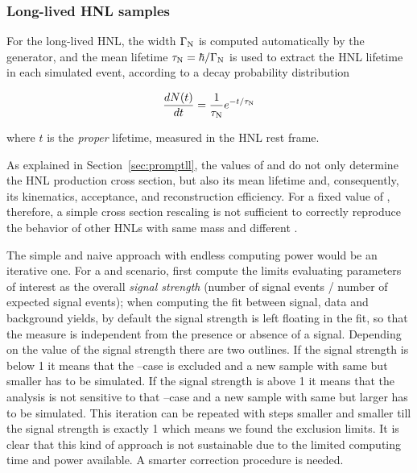\subsubsection{Long-lived HNL samples}\label{sec:reweighting}
For the long-lived HNL, the width $\Gamma_{\mathrm{N}}$ is computed automatically by the
generator, and the mean lifetime $\tau_{\mathrm{N}} = \hbar/\Gamma_{\mathrm{N}}$
is used to extract the HNL lifetime in each simulated event,
according to a decay probability distribution
\begin{linenomath}
  \begin{equation}
\frac{dN(t)}{dt} = \frac{1}{\tau_{\mathrm{N}}}e^{-t/\tau_{\mathrm{N}}}
  \end{equation}
  \label{eq:dndt}
\end{linenomath}
where $t$ is the
\emph{proper} lifetime, measured in the HNL rest frame.

As explained in Section~\ref{sec:promptll}, the values of \mhnl
and \mixpar do not only determine the HNL production cross section,
but also its mean lifetime and, consequently, its kinematics,
acceptance, and reconstruction efficiency.
For a fixed value of \mhnl, therefore, a simple cross section
rescaling is not sufficient to correctly reproduce the behavior of
other HNLs with same mass and different \mixpar.

The simple and naive approach with endless computing power would be an
iterative one. For a \mhnl
and \mixpar scenario, first compute the limits evaluating parameters
of interest as the overall \emph{signal strength} (number of signal events /
number of expected signal events); when computing the fit between
signal, data and background yields, by default the signal strength is
left floating in the fit, so that the measure is independent from the
presence or absence of a signal. Depending on the value of the signal
strength there are two outlines. If the signal strength is below 1 it
means that the \mhnl --\mixpar case is excluded and a new sample with
same \mhnl but smaller \mixpar has to be simulated. If the signal strength is above 1 it
means that the analysis is not sensitive to that \mhnl --\mixpar case and a new sample with
same \mhnl but larger \mixpar has to be simulated. This iteration can
be repeated with steps smaller and smaller till the signal strength is
exactly 1 which means we found the exclusion limits. It is clear that
this kind of approach is not sustainable due to the limited computing
time and power available. A smarter correction procedure is needed.

